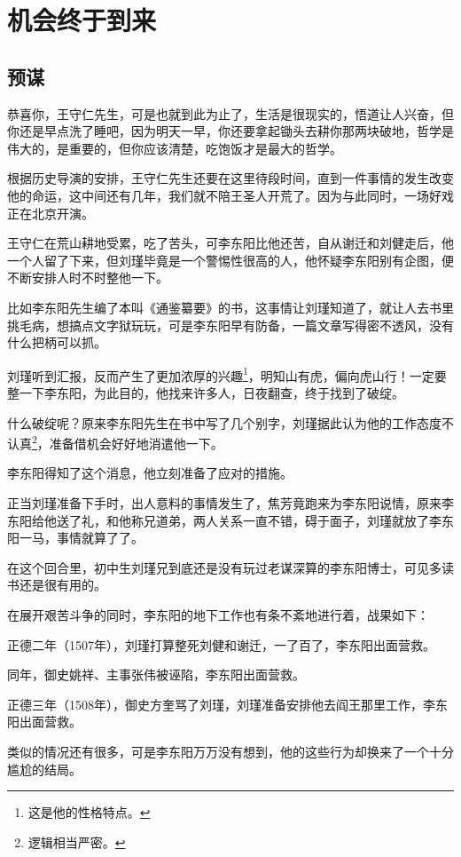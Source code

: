 \section{机会终于到来}
\ifnum{}
	\begin{multicols}{\theparacolNo}
		\fi
		\subsection{预谋}
		恭喜你，王守仁先生，可是也就到此为止了，生活是很现实的，悟道让人兴奋，但你还是早点洗了睡吧，因为明天一早，你还要拿起锄头去耕你那两块破地，哲学是伟大的，是重要的，但你应该清楚，吃饱饭才是最大的哲学。

		根据历史导演的安排，王守仁先生还要在这里待段时间，直到一件事情的发生改变他的命运，这中间还有几年，我们就不陪王圣人开荒了。因为与此同时，一场好戏正在北京开演。

		王守仁在荒山耕地受累，吃了苦头，可李东阳比他还苦，自从谢迁和刘健走后，他一个人留了下来，但刘瑾毕竟是一个警惕性很高的人，他怀疑李东阳别有企图，便不断安排人时不时整他一下。

		比如李东阳先生编了本叫《通鉴纂要》的书，这事情让刘瑾知道了，就让人去书里挑毛病，想搞点文字狱玩玩，可是李东阳早有防备，一篇文章写得密不透风，没有什么把柄可以抓。

		刘瑾听到汇报，反而产生了更加浓厚的兴趣\footnote{这是他的性格特点。}，明知山有虎，偏向虎山行！一定要整一下李东阳，为此目的，他找来许多人，日夜翻查，终于找到了破绽。

		什么破绽呢？原来李东阳先生在书中写了几个别字，刘瑾据此认为他的工作态度不认真\footnote{逻辑相当严密。}，准备借机会好好地消遣他一下。

		李东阳得知了这个消息，他立刻准备了应对的措施。

		正当刘瑾准备下手时，出人意料的事情发生了，焦芳竟跑来为李东阳说情，原来李东阳给他送了礼，和他称兄道弟，两人关系一直不错，碍于面子，刘瑾就放了李东阳一马，事情就算了了。

		在这个回合里，初中生刘瑾兄到底还是没有玩过老谋深算的李东阳博士，可见多读书还是很有用的。

		在展开艰苦斗争的同时，李东阳的地下工作也有条不紊地进行着，战果如下：

		正德二年（1507年），刘瑾打算整死刘健和谢迁，一了百了，李东阳出面营救。

		同年，御史姚祥、主事张伟被诬陷，李东阳出面营救。

		正德三年（1508年），御史方奎骂了刘瑾，刘瑾准备安排他去阎王那里工作，李东阳出面营救。

		类似的情况还有很多，可是李东阳万万没有想到，他的这些行为却换来了一个十分尴尬的结局。


\end{multicols}
